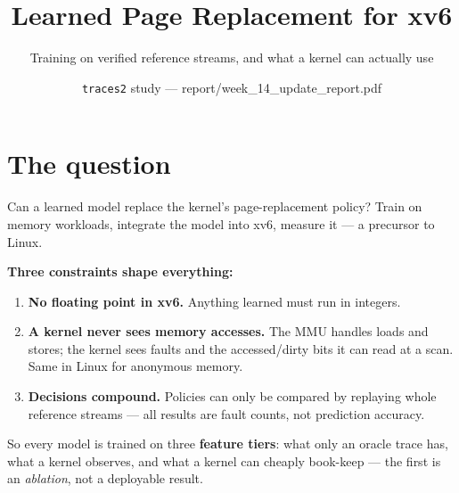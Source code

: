 \documentclass[10pt,aspectratio=169]{beamer}
\title{Learned Page Replacement for xv6}
\subtitle{Training on verified reference streams, and what a kernel can actually use}
\date{\texttt{traces2} study --- report/week\_14\_update\_report.pdf}
\begin{document}
\maketitle

\section{The question}

\begin{frame}{Can a learned model replace the kernel's page-replacement policy?}
  \small
  Train on memory workloads, integrate the model into xv6, measure it --- a
  precursor to Linux.

  \medskip
  \textbf{Three constraints shape everything:}
  \begin{enumerate}
    \item \textbf{No floating point in xv6.} Anything learned must run in integers.
    \item \textbf{A kernel never sees memory accesses.} The MMU handles loads and
      stores; the kernel sees faults and the accessed/dirty bits it can read at a
      scan. Same in Linux for anonymous memory.
    \item \textbf{Decisions compound.} Policies can only be compared by replaying
      whole reference streams --- all results are fault counts, not prediction accuracy.
  \end{enumerate}

  \medskip
  So every model is trained on three \textbf{feature tiers}: what only an oracle
  trace has, what a kernel observes, and what a kernel can cheaply book-keep ---
  the first is an \emph{ablation}, not a deployable result.
\end{frame}
\end{document}
